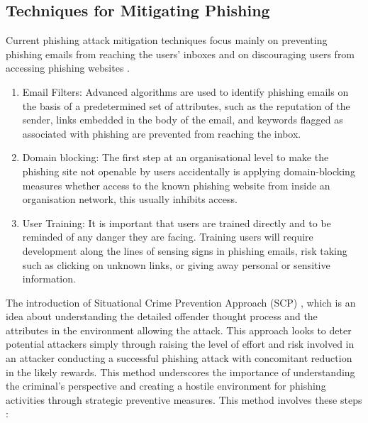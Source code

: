 \subsection{Techniques for Mitigating Phishing}

Current phishing attack mitigation techniques focus mainly on preventing phishing
emails from reaching the users’ inboxes and on discouraging users from accessing
phishing websites \cite{Suzuki2021Phishing}.

\begin{enumerate}
    \item Email Filters: Advanced algorithms are used to identify phishing emails on the basis of a predetermined set of attributes, such as the reputation of the sender, links embedded in the body of the email, and keywords flagged as associated with phishing are prevented from reaching the inbox.
    \item Domain blocking: The first step at an organisational level to make the phishing site not openable by users accidentally is applying domain-blocking measures whether access to the known phishing website from inside an organisation network, this usually inhibits access.
    \item User Training: It is important that users are trained directly and to be reminded of any danger they are facing. Training users will require development along the lines of sensing signs in phishing emails, risk taking such as clicking on unknown links, or giving away personal or sensitive information.
\end{enumerate}

The introduction of Situational Crime Prevention Approach (SCP) \cite{Suzuki2021Phishing}, which is an idea about understanding the detailed offender thought process and the attributes in the environment allowing the attack. This approach looks to deter potential attackers simply through raising the level of effort and risk involved in an attacker conducting a successful phishing attack with concomitant reduction in the likely rewards. This method underscores the importance of understanding the criminal's perspective and creating a hostile environment for phishing activities through strategic preventive measures. This method involves these steps : 


